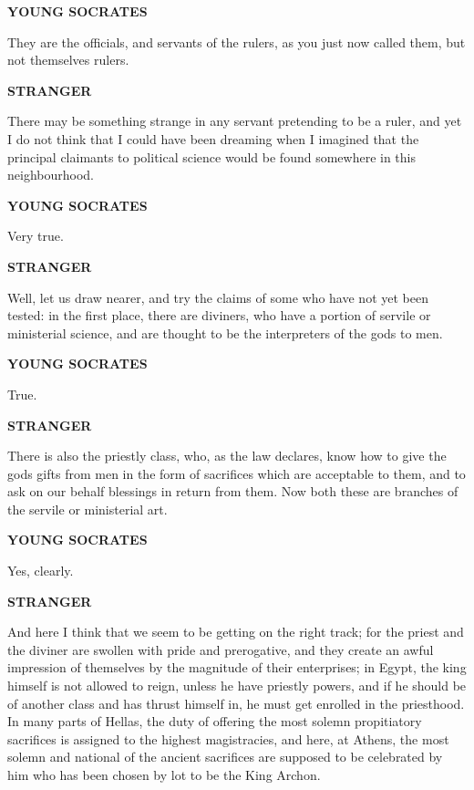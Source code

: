 \documentclass[11pt,letter]{article}
\begin{document}
\par \textbf{YOUNG SOCRATES}
\par   They are the officials, and servants of the rulers, as you just now called them, but not themselves rulers.

\par \textbf{STRANGER}
\par   There may be something strange in any servant pretending to be a ruler, and yet I do not think that I could have been dreaming when I imagined that the principal claimants to political science would be found somewhere in this neighbourhood.

\par \textbf{YOUNG SOCRATES}
\par   Very true.

\par \textbf{STRANGER}
\par   Well, let us draw nearer, and try the claims of some who have not yet been tested:  in the first place, there are diviners, who have a portion of servile or ministerial science, and are thought to be the interpreters of the gods to men.

\par \textbf{YOUNG SOCRATES}
\par   True.

\par \textbf{STRANGER}
\par   There is also the priestly class, who, as the law declares, know how to give the gods gifts from men in the form of sacrifices which are acceptable to them, and to ask on our behalf blessings in return from them. Now both these are branches of the servile or ministerial art.

\par \textbf{YOUNG SOCRATES}
\par   Yes, clearly.

\par \textbf{STRANGER}
\par   And here I think that we seem to be getting on the right track; for the priest and the diviner are swollen with pride and prerogative, and they create an awful impression of themselves by the magnitude of their enterprises; in Egypt, the king himself is not allowed to reign, unless he have priestly powers, and if he should be of another class and has thrust himself in, he must get enrolled in the priesthood. In many parts of Hellas, the duty of offering the most solemn propitiatory sacrifices is assigned to the highest magistracies, and here, at Athens, the most solemn and national of the ancient sacrifices are supposed to be celebrated by him who has been chosen by lot to be the King Archon.
\end{document}
